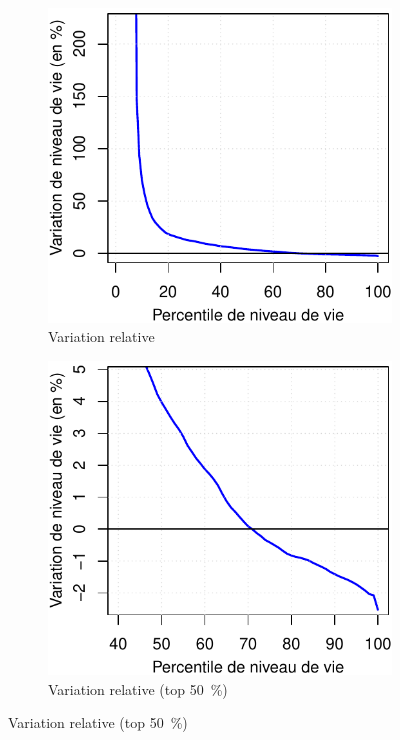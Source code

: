 \documentclass[a5paper,french]{memoir}
\begin{document}
\begin{figure}[h!]
\begin{subfigure}{.5\textwidth}
\end{subfigure}
\\ \quad \\
\begin{subfigure}{.5\textwidth}
  \caption{Variation relative}\label{fig:evol_distr_c}
  \includegraphics[width=\textwidth]{../figures/policies/gcp_var_rev.pdf}
\end{subfigure} \quad
\begin{subfigure}{.5\textwidth}
  \caption{Variation relative (top 50~\%)}\label{fig:evol_distr_d}
  \includegraphics[width=\textwidth]{../figures/policies/gcp_var_rev_rich_only.pdf}

\end{subfigure}
\end{figure}
\end{document}
